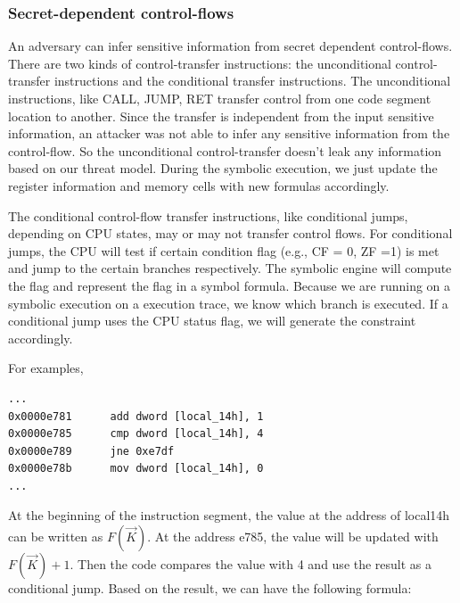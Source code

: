 \subsubsection{Secret-dependent control-flows}
An adversary can infer sensitive information from secret dependent control-flows. 
There are two kinds of control-transfer instructions: the unconditional 
control-transfer instructions and the conditional transfer instructions.
The unconditional instructions, like CALL, JUMP, RET transfer control
from one code segment location to another. Since the transfer is 
independent from the input sensitive information, an attacker was 
not able to infer any sensitive information from the control-flow. 
So the unconditional control-transfer doesn't leak any information 
based on our threat model. During the symbolic execution, 
we just update the register information and memory cells with 
new formulas accordingly.

The conditional control-flow transfer instructions, like conditional jumps,
depending on CPU states, may or may not transfer control flows.
For conditional jumps, the CPU will test if certain condition flag 
(e.g., CF = 0, ZF =1) is met and jump to the certain branches respectively.
The symbolic engine will compute the flag and represent the flag 
in a symbol formula. Because we are running on a symbolic execution 
on a execution trace, we know which branch is executed.
If a conditional jump uses the CPU status flag, we will generate 
the constraint accordingly.



For examples,

\begin{lstlisting}
...
0x0000e781      add dword [local_14h], 1
0x0000e785      cmp dword [local_14h], 4
0x0000e789      jne 0xe7df
0x0000e78b      mov dword [local_14h], 0
...
\end{lstlisting}

At the beginning of the instruction segment, the value at the 
address of local14h can be written as $F(\vec{K})$. At the address e785, 
the value will be updated with $F(\vec{K})+1$. Then the code compares 
the value with 4 and use the result as a conditional jump. 
Based on the result, we can have the following formula:

